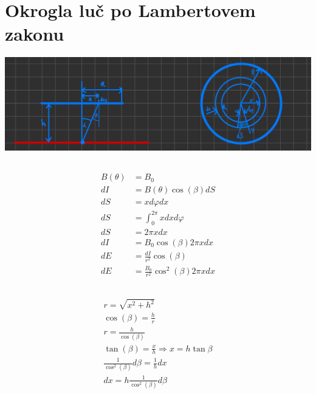 \documentclass[a4paper,12pt]{article}
\begin{document}
\section{Okrogla luč po Lambertovem zakonu}
\includegraphics[width=\textwidth]{lambertova_luc.png}
\subsection{}
\begin{align}
    B(\theta) & = B_0                                      \\
    dI        & = B(\theta) \cos(\beta) dS                 \\
    dS        & = x d\varphi dx                            \\
    dS        & = \int_0^{2 \pi} x dx d\varphi             \\
    dS        & = 2 \pi x dx                               \\
    dI        & = B_0 \cos(\beta) 2 \pi x dx               \\
    dE        & = \frac{dI}{r^2} \cos(\beta)               \\
    dE        & = \frac{B_0}{r^2} \cos^2(\beta) 2 \pi x dx
\end{align}

\subsection{}
\begin{align}
    r = \sqrt{x^2 + h^2}                                     \\
    \cos(\beta) = \frac{h}{r}                                \\
    r = \frac{h}{\cos(\beta)}                                \\
    \tan(\beta)  = \frac{x}{h} \Rightarrow x = h \tan{\beta} \\
    \frac{1}{\cos^2(\beta)} d \beta = \frac{1}{h} dx         \\
    dx = h \frac{1}{\cos^2(\beta)} d\beta
\end{align}
\end{document}
